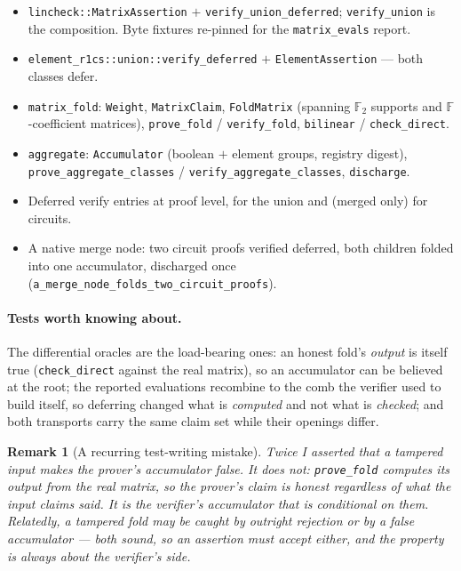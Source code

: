 \documentclass[11pt]{article}
\newcommand{\F}{\mathbb{F}}
\newcommand{\Ftwo}{\F_2}
\newcommand{\code}[1]{\texttt{#1}}
\newtheorem{remark}{Remark}
\theoremstyle{definition}
\begin{document}
\begin{itemize}[nosep]
  \item \code{lincheck::MatrixAssertion} $+$ \code{verify\_union\_deferred};
        \code{verify\_union} is the composition. Byte fixtures re-pinned for
        the \code{matrix\_evals} report.
  \item \code{element\_r1cs::union::verify\_deferred} $+$
        \code{ElementAssertion} --- both classes defer.
  \item \code{matrix\_fold}: \code{Weight}, \code{MatrixClaim},
        \code{FoldMatrix} (spanning $\Ftwo$ supports and $\F$-coefficient
        matrices), \code{prove\_fold} / \code{verify\_fold},
        \code{bilinear} / \code{check\_direct}.
  \item \code{aggregate}: \code{Accumulator} (boolean $+$ element groups,
        registry digest), \code{prove\_aggregate\_classes} /
        \code{verify\_aggregate\_classes}, \code{discharge}.
  \item Deferred verify entries at proof level, for the union and (merged
        only) for circuits.
  \item A native merge node: two circuit proofs verified deferred, both
        children folded into one accumulator, discharged once
        (\code{a\_merge\_node\_folds\_two\_circuit\_proofs}).
\end{itemize}

\paragraph{Tests worth knowing about.} The differential oracles are the
load-bearing ones: an honest fold's \emph{output} is itself true
(\code{check\_direct} against the real matrix), so an accumulator can be
believed at the root; the reported evaluations recombine to the comb the
verifier used to build itself, so deferring changed what is \emph{computed}
and not what is \emph{checked}; and both transports carry the same claim set
while their openings differ.

\begin{remark}[A recurring test-writing mistake]
Twice I asserted that a tampered input makes the \emph{prover's}
accumulator false. It does not: \code{prove\_fold} computes its output from
the real matrix, so the prover's claim is honest regardless of what the
input claims said. It is the \emph{verifier's} accumulator that is
conditional on them. Relatedly, a tampered fold may be caught by outright
rejection \emph{or} by a false accumulator --- both sound, so an assertion
must accept either, and the property is always about the verifier's side.
\end{remark}
\end{document}
